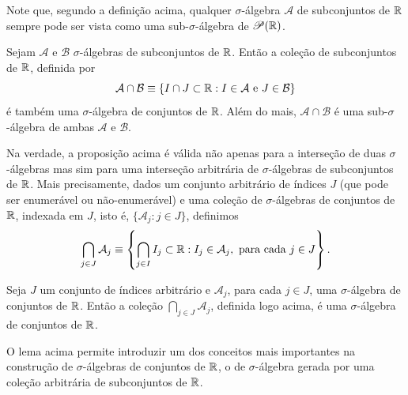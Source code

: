         Note que, segundo a definição acima, 
        qualquer $\sigma$-álgebra $\mathcal{A}$ de subconjuntos de $\mathbb{R}$ 
        sempre pode ser vista como uma sub-$\sigma$-álgebra de $\mathscr{P}(\mathbb{R})$.
        \begin{proposicao}
        \label{prop-intersecao-sigma-algebras}
            Sejam $\mathcal{A}$ e $\mathcal{B}$  
            $\sigma$-álgebras de subconjuntos de $\mathbb{R}$. 
            Então a coleção de subconjuntos de $\mathbb{R}$, definida por
            \[
                \mathcal{A}\cap \mathcal{B} 
                \equiv 
                \{
                    I\cap J \subset \R : I\in \mathcal{A}\ \textrm{e}\ J\in\mathcal{B} 
                \}
            \]
            é também uma $\sigma$-álgebra de conjuntos de $\mathbb{R}$.
            Além do mais, $\mathcal{A}\cap \mathcal{B}$ é uma 
            sub-$\sigma$-álgebra de ambas $\mathcal{A}$ e $\mathcal{B}$.
        \end{proposicao}
        Na verdade, a proposição acima é válida não apenas para a interseção de
        duas $\sigma$-álgebras mas sim para uma interseção arbitrária 
        de $\sigma$-álgebras de subconjuntos de $\mathbb{R}$. 
        Mais precisamente, dados um 
        conjunto arbitrário de índices $J$ 
        (que pode ser enumerável ou não-enumerável)
        e uma coleção de $\sigma$-álgebras de conjuntos de $\mathbb{R}$, 
        indexada em $J$, isto é, $\{\mathcal{A}_{j}: j\in J\}$, definimos
        \[
            \bigcap_{j\in J} \mathcal{A}_j
            \equiv
            \left\{ 
                \bigcap_{j\in I} I_j \subset\mathbb{R} : 
                I_j\in \mathcal{A}_j,\ \text{para cada}\ j\in J  
            \right\}.
        \]
        \begin{lema}
        \label{lema-intersecao-arbitraria-sigma-algebras}
            Seja $J$ um conjunto de índices arbitrário e 
            $\mathcal{A}_j$, para cada $j\in J$, uma $\sigma$-álgebra 
            de conjuntos de $\mathbb{R}$. Então
            a coleção $\bigcap_{j\in J}\mathcal{A}_j$, 
            definida logo acima, é uma $\sigma$-álgebra
            de conjuntos de $\mathbb{R}$.
        \end{lema}
        O lema acima permite introduzir um dos conceitos mais importantes
        na construção de $\sigma$-álgebras de conjuntos de $\mathbb{R}$,
        o de $\sigma$-álgebra gerada 
        por uma coleção arbitrária de subconjuntos de $\mathbb{R}$.
